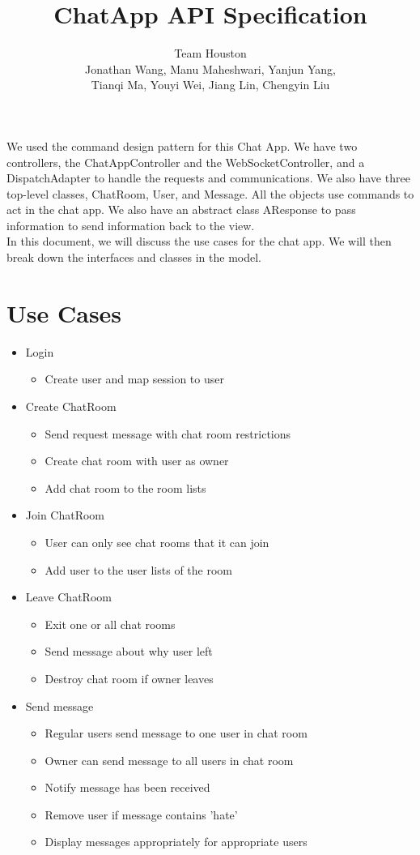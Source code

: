 \documentclass[letterpaper, 11pt]{article}
\title{ChatApp API Specification}
\author{Team Houston\\ Jonathan Wang, Manu Maheshwari, Yanjun Yang,\\ Tianqi Ma, Youyi Wei, Jiang Lin, Chengyin Liu}
\date{}
\begin{document}
\maketitle

We used the command design pattern for this Chat App. We have two controllers, the ChatAppController and the WebSocketController, and a DispatchAdapter to handle the requests and communications. We also have three top-level classes, ChatRoom, User, and Message. All the objects use commands to act in the chat app. We also have an abstract class AResponse to pass information to send information back to the view. \\

In this document, we will discuss the use cases for the chat app. We will then break down the interfaces and classes in the model. 

\section{Use Cases}
\begin{itemize}
  \item Login
  \begin{itemize}
    \item Create user and map session to user
     \end{itemize}
  \item Create ChatRoom
  \begin{itemize}
    \item Send request message with chat room restrictions
    \item Create chat room with user as owner
    \item Add chat room to the room lists
      \end{itemize}
  \item Join ChatRoom
  \begin{itemize}
    \item User can only see chat rooms that it can join
    \item Add user to the user lists of the room
  \end{itemize}
  \item Leave ChatRoom
  \begin{itemize}
    \item Exit one or all chat rooms
    \item Send message about why user left
    \item Destroy chat room if owner leaves
  \end{itemize}
  \item Send message
  \begin{itemize}
    \item Regular users send message to one user in chat room
    \item Owner can send message to all users in chat room
    \item Notify message has been received
    \item Remove user if message contains 'hate'
    \item Display messages appropriately for appropriate users
  \end{itemize}
\end{itemize}
\end{document}
